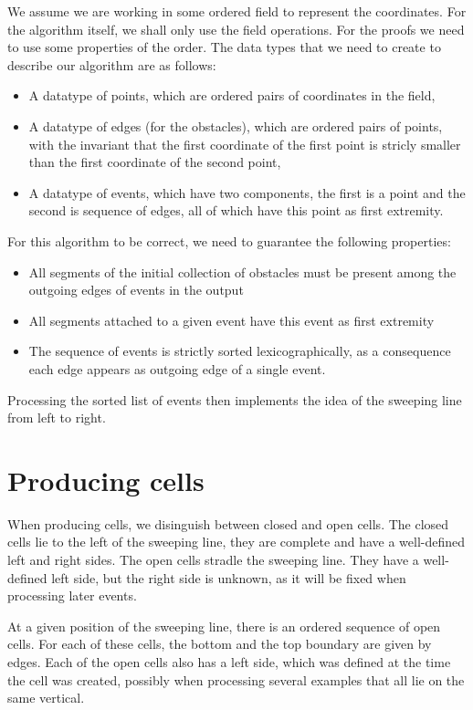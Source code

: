 \documentclass{easychair}
\begin{document}
We assume we are working in some ordered field to represent the
coordinates.  For the algorithm itself, we shall only use the field
operations.  For the proofs we need to use some properties of the order.
The data types that we need to create to describe our algorithm are as
follows:
\begin{itemize}
\item A datatype of points, which are ordered pairs of coordinates in the field,
\item A datatype of edges (for the obstacles), which are ordered pairs of
  points, with the invariant that the first coordinate of the first
  point is stricly smaller than the first coordinate of the second point,
\item A datatype of events, which have two components, the first is a
  point and the second is sequence of edges, all of which have this
  point as first extremity.
\end{itemize}
For this algorithm to be correct, we need to guarantee the following
properties:
\begin{itemize}
\item All segments of the initial collection of obstacles must be
  present among the outgoing edges of events in the output
\item All segments attached to a given event have this event as first
  extremity
\item The sequence of events is strictly sorted lexicographically, as
  a consequence each edge appears as outgoing edge of a single event.
\end{itemize}

Processing the sorted list of events then implements the idea of the
sweeping line from left to right.

\section{Producing cells}
When producing cells, we disinguish between closed and open cells.
The closed cells lie to the left of the sweeping line, they are
complete and have a well-defined left and right sides.  The open cells
stradle the sweeping line.  They have a well-defined left side,
but the right side is unknown, as it will be fixed when
processing later events.

At a given position of the sweeping line, there is an ordered sequence
of open cells.  For each of these cells, the bottom and the top
boundary are given by edges.  Each of the open cells also has a
left side, which was defined at the time the cell was created,
possibly when processing several examples that all lie on the same
vertical.
\end{document}
